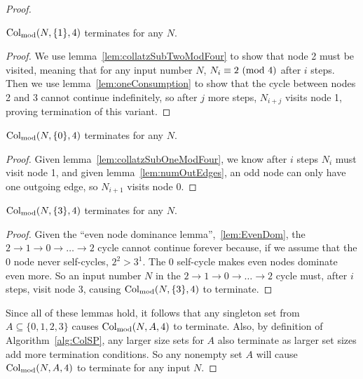 \begin{proof}
\begin{lemma}
\label{lem:collatzSubOneModFour}
$\mathrm{Col}_{\text{mod}}(N,\{1\},4)$ terminates for any $N$.
\end{lemma}
\begin{proof}
We use lemma~\ref{lem:collatzSubTwoModFour} to show that node 2 must be visited, meaning that for any input number $N$, $N_i \equiv 2 \ (\mathrm{mod}\ 4)$ after $i$ steps. Then we use lemma~\ref{lem:oneConsumption} to show that the cycle between nodes 2 and 3 cannot continue indefinitely, so after $j$ more steps, $N_{i+j}$ visits node 1, proving termination of this variant.
\end{proof}
\begin{lemma}
\label{lem:collatzSubZeroModFour}
$\mathrm{Col}_{\text{mod}}(N,\{0\},4)$ terminates for any $N$.
\end{lemma}
\begin{proof}
Given lemma~\ref{lem:collatzSubOneModFour}, we know after $i$ steps $N_i$ must visit node 1, and given lemma~\ref{lem:numOutEdges}, an odd node can only have one outgoing edge, so $N_{i+1}$ visits node 0.
\end{proof}
\begin{lemma}
\label{lem:collatzSubThreeModFour}
$\mathrm{Col}_{\text{mod}}(N,\{3\},4)$ terminates for any $N$.
\end{lemma}
\begin{proof}
Given the ``even node dominance lemma'',~\ref{lem:EvenDom}, the $2 \rightarrow 1 \rightarrow 0 \rightarrow \ldots \rightarrow 2$ cycle cannot continue forever because, if we assume that the 0 node never self-cycles, $2^2 > 3^1$. The 0 self-cycle makes even nodes dominate even more. So an input number $N$ in the $2 \rightarrow 1 \rightarrow 0 \rightarrow \ldots \rightarrow 2$ cycle must, after $i$ steps, visit node 3, causing $\mathrm{Col}_{\text{mod}}(N,\{3\},4)$ to terminate.
\end{proof}
Since all of these lemmas hold, it follows that any singleton set from $A \subseteq \{0,1,2,3\}$ causes $\mathrm{Col}_{\text{mod}}(N,A,4)$ to terminate. Also, by definition of Algorithm~\ref{alg:ColSP}, any larger size sets for $A$ also terminate as larger set sizes add more termination conditions. So any nonempty set $A$ will cause $\mathrm{Col}_{\text{mod}}(N,A,4)$ to terminate for any input $N$.
\end{proof}
